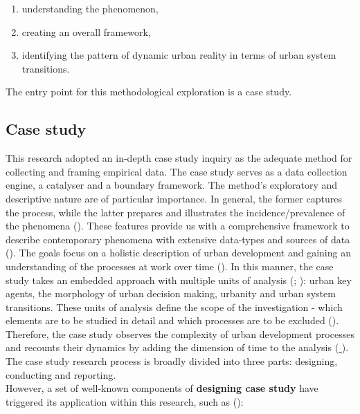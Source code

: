 \documentclass[11pt]{report}
\begin{document}
{{{{\begin{enumerate}
\item understanding the phenomenon,
\item creating an overall framework,
\item identifying the pattern of dynamic urban reality in terms of urban system transitions. 
\end{enumerate} 

The entry point for this methodological exploration is a case study.

\subsection{Case study}

This research adopted an in-depth case study inquiry as the adequate method for collecting and framing empirical data. The case study serves as a data collection engine, a catalyser and a boundary framework. The method’s exploratory and descriptive nature are of particular importance. In general, the former captures the process, while the latter prepares and illustrates the incidence/prevalence of the phenomena (\href{Yin} {\citealt{yin_applications_2011}}). These features provide us with a comprehensive framework to describe contemporary phenomena with extensive data-types and sources of data (\href{Feagin}{\citealt{feagin_case_1991}}). The goals focus on a holistic description of urban development and gaining an understanding of the processes at work over time (\href{Swanborn}{\citealt{swanborn_case_2010}}). In this manner, the case study takes an embedded approach with multiple units of analysis (\href{Scholz}{\citealt{scholz_embedded_2002}}; \href{Yin} {\citealt{yin_case_2009}}): urban key agents, the morphology of urban decision making, urbanity and urban system transitions. These units of analysis define the scope of the investigation - which elements are to be studied in detail and which processes are to be excluded (\href{Harrison}{\citealt{partington_case_2002}}).
\\

Therefore, the case study observes the complexity of urban development processes and recounts their dynamics by adding the dimension of time to the analysis (\href{Feagin}{ \citealt{feagin_case_1991}}).
The case study research process is broadly divided into three parts: designing, conducting and reporting. 
\\

However, a set of well-known components of \textbf{designing case study} have triggered its application within this research, such as (\href{Yin} {\citealt{yin_case_2009}}):

}}}}
\end{document}
